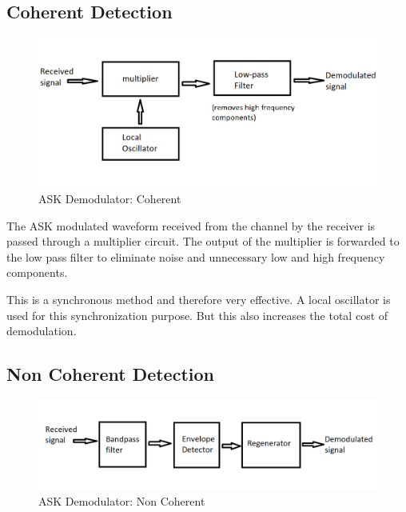 \documentclass{report}
\begin{document}
	\subsection{Coherent Detection}
	
	\bigskip
	
	
	\begin{figure}[H]
		\centering
		\includegraphics[scale=0.4]{images/synchronous_detector.png}
		\caption{ASK Demodulator: Coherent}
	\end{figure}	
	
	\bigskip
	
	The ASK modulated waveform received from the channel by the receiver is passed through a multiplier circuit. The output of the multiplier is forwarded to the low pass filter to eliminate noise and unnecessary low and high frequency components. 
	\bigskip
	
	This is a synchronous method and therefore very effective. A local oscillator is used for this synchronization purpose. But this also increases the total cost of demodulation.
	
	\bigskip
	\newpage
	\subsection{Non Coherent Detection}
	
	\bigskip
	
	
	\begin{figure}[H]
		\centering
		\includegraphics[scale=0.4]{images/asynchronous_detector.png}
		\caption{ASK Demodulator: Non Coherent}
	\end{figure}	
	
\end{document}
